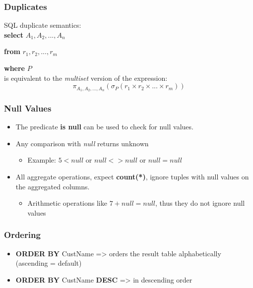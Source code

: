 \subsubsection{Duplicates}

SQL duplicate semantics:\\

\quad \textbf{select} $A_1,A_2,...,A_n$ \

\quad \textbf{from} $r_1, r_2,...,r_m$ \

\quad \textbf{where} $P$\\

is equivalent to the \textit{multiset} version of the expression: \[
\pi_{A_1,A_2,...,A_n}(\sigma_P (r_1 \times r_2 \times ... \times r_m))
\]

\subsubsection{Null Values}
\begin{itemize}
    \item The  predicate \textbf{is null} can be used to check for null values.
    \item Any comparison with \textit{null} returns unknown
    \begin{itemize}
        \item Example: $5<null$ or $null<>null$ or $null=null$ 
    \end{itemize}
    \item All aggregate operations, expect \textbf{count(*)}, ignore tuples with null values on the aggregated columns. 
    \begin{itemize}
        \item Arithmetic operations like $7+ null = null$, thus they do not ignore null values
    \end{itemize}
\end{itemize}

\subsubsection{Ordering}

\begin{itemize}
    \item \textbf{ORDER BY} CustName => orders the result table alphabetically (ascending = default)
    \item \textbf{ORDER BY} CustName \textbf{DESC} => in descending order
\end{itemize}

